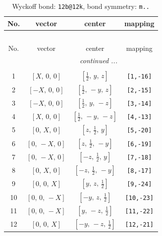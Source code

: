 \documentclass[fleqn,8pt]{jsarticle}
\begin{document}
\renewcommand{\arraystretch}{1.2}
\begin{longtable}{cccc}
\caption{Wyckoff bond: {\tt 12b@12k}, bond symmetry: {\tt m..}}
 \\
 \hline \hline
No. & vector & center & mapping \\ \hline \endfirsthead

\multicolumn{3}{l}{\tablename\ \thetable{}} \\
 \hline \hline
No. & vector & center & mapping \\ \hline \endhead

 \hline \hline
\multicolumn{3}{r}{\footnotesize\it continued ...} \\ \endfoot

 \hline \hline
\multicolumn{3}{r}{} \\ \endlastfoot

1 & $\left[ X,\, 0,\, 0 \right]$ & $\left[ \frac{1}{2},\, y,\, z \right]$ & {\tt [1,-16]} \\ \hline
2 & $\left[ - X,\, 0,\, 0 \right]$ & $\left[ \frac{1}{2},\, - y,\, z \right]$ & {\tt [2,-15]} \\ \hline
3 & $\left[ - X,\, 0,\, 0 \right]$ & $\left[ \frac{1}{2},\, y,\, - z \right]$ & {\tt [3,-14]} \\ \hline
4 & $\left[ X,\, 0,\, 0 \right]$ & $\left[ \frac{1}{2},\, - y,\, - z \right]$ & {\tt [4,-13]} \\ \hline
5 & $\left[ 0,\, X,\, 0 \right]$ & $\left[ z,\, \frac{1}{2},\, y \right]$ & {\tt [5,-20]} \\ \hline
6 & $\left[ 0,\, - X,\, 0 \right]$ & $\left[ z,\, \frac{1}{2},\, - y \right]$ & {\tt [6,-19]} \\ \hline
7 & $\left[ 0,\, - X,\, 0 \right]$ & $\left[ - z,\, \frac{1}{2},\, y \right]$ & {\tt [7,-18]} \\ \hline
8 & $\left[ 0,\, X,\, 0 \right]$ & $\left[ - z,\, \frac{1}{2},\, - y \right]$ & {\tt [8,-17]} \\ \hline
9 & $\left[ 0,\, 0,\, X \right]$ & $\left[ y,\, z,\, \frac{1}{2} \right]$ & {\tt [9,-24]} \\ \hline
10 & $\left[ 0,\, 0,\, - X \right]$ & $\left[ - y,\, z,\, \frac{1}{2} \right]$ & {\tt [10,-23]} \\ \hline
11 & $\left[ 0,\, 0,\, - X \right]$ & $\left[ y,\, - z,\, \frac{1}{2} \right]$ & {\tt [11,-22]} \\ \hline
12 & $\left[ 0,\, 0,\, X \right]$ & $\left[ - y,\, - z,\, \frac{1}{2} \right]$ & {\tt [12,-21]} \\
\end{longtable}
\end{document}
